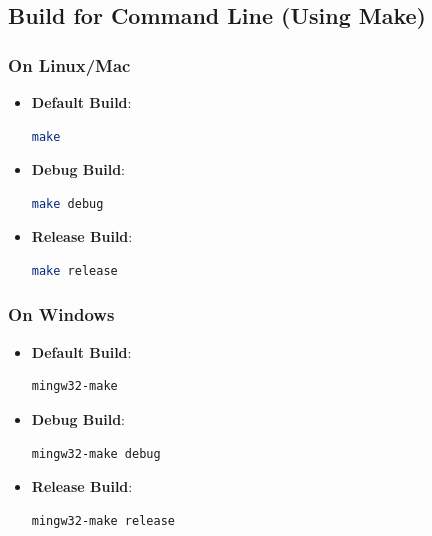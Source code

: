 \documentclass[12pt,a4paper]{report}
\begin{document}
\subsection{Build for Command Line (Using Make)}
\subsubsection{On Linux/Mac}
\begin{itemize}
    \item \normalsize \textbf{Default Build}:
    \begin{lstlisting}[language=Bash, caption=Building the Application: Default Build Using Make on Linux/Mac]
    make
    \end{lstlisting}
    \item \normalsize \textbf{Debug Build}:
    \begin{lstlisting}[language=Bash, caption=Building the Application: Debug Build Using Make on Linux/Mac]
    make debug
    \end{lstlisting}
    \item \normalsize \textbf{Release Build}:
    \begin{lstlisting}[language=Bash, caption=Building the Application: Release Build Using Make on Linux/Mac]
    make release
    \end{lstlisting}
\end{itemize}

\subsubsection{On Windows}
\begin{itemize}
    \item \normalsize \textbf{Default Build}:
    \begin{lstlisting}[language=Bash, caption=Building the Application: Default Build Using Make on Windows]
    mingw32-make
    \end{lstlisting}
    \item \normalsize \textbf{Debug Build}:
    \begin{lstlisting}[language=Bash, caption=Building the Application: Debug Build Using Make on Windows]
    mingw32-make debug
    \end{lstlisting}
    \item \normalsize \textbf{Release Build}:
    \begin{lstlisting}[language=Bash, caption=Building the Application: Release Build Using Make on Windows]
    mingw32-make release
    \end{lstlisting}
\end{itemize}
\end{document}
